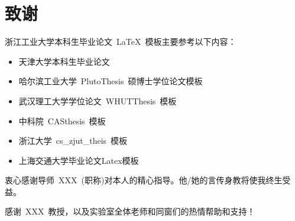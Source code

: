 
\chapter{致谢}

浙江工业大学本科生毕业论文~\LaTeX~模板主要参考以下内容：
\begin{itemize}
  \item 天津大学本科生毕业论文
  \item 哈尔滨工业大学~PlutoThesis~硕博士学位论文模板
  \item 武汉理工大学学位论文~WHUTThesis~模板
  \item 中科院~CASthesis~模板
  \item 浙江大学~cs\_zjut\_theis~模板
  \item 上海交通大学毕业论文Latex模板
\end{itemize}

\vspace*{1em}

衷心感谢导师~XXX~(职称)对本人的精心指导。他/她的言传身教将使我终生受益。

感谢~XXX~教授，以及实验室全体老师和同窗们的热情帮助和支持！




